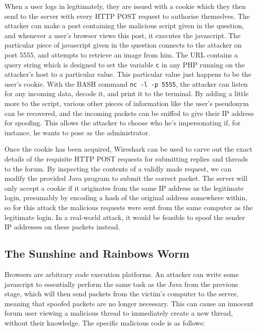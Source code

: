 When a user logs in legitimately, they are issued with a cookie which they then send to the server with every HTTP POST
request to authorise themselves. The attacker can make a post containing the malicious script given in the question, and
whenever a user's browser views this post, it executes the javascript. The particular piece of javascript given in the
question connects to the attacker on port 5555, and attempts to retrieve an image from him. The URL contains a query
string which is designed to set the variable {\tt c} in any PHP running on the attacker's host to a particular value.
This particular value just happens to be the user's cookie. With the BASH command {\tt nc -l -p 5555}, the attacker can
listen for any incoming data, decode it, and print it to the terminal. By adding a little more to the script, various
other pieces of information like the user's pseudonym can be recovered, and the incoming packets can be sniffed to give
their IP address for spoofing. This allows the attacker to choose who he's impersonating if, for instance, he wants to
pose as the administrator.

Once the cookie has been acquired, Wireshark can be used to carve out the exact details of the requisite HTTP POST
requests for submitting replies and threads to the forum. By inspecting the contents of a validly made request, we can
modify the provided Java program to submit the correct packet. The server will only accept a cookie if it originates
from the same IP address as the legitimate login, presumably by encoding a hash of the original address somewhere
within, so for this attack the malicious requests were sent from the same computer as the legitimate login. In a
real-world attack, it would be feasible to spoof the sender IP addresses on these packets instead.


\subsection{The Sunshine and Rainbows Worm}

Browsers are arbitrary code execution platforms. An attacker can write some javascript to essentially perform the same
task as the Java from the previous stage, which will then send packets from the victim's computer to the server, meaning
that spoofed packets are no longer necessary. This can cause an innocent forum user viewing a malicious thread to
immediately create a new thread, without their knowledge. The specific malicious code is as follows:


